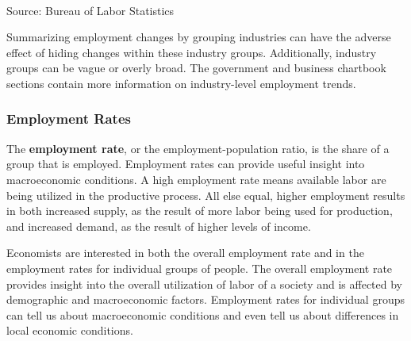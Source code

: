 \documentclass{report}
\newcommand{\tbllink}[1]{\href{https://raw.githubusercontent.com/bdecon/US-chartbook/master/chartbook/data/#1}{\faTable}}
\begin{document}
{\begin{minipage}{0.83\textwidth}
\hspace*{-3mm} \noindent {} \setlength{\tabcolsep}{3.6pt} \color{black!90}
		{\renewcommand{\arraystretch}{1.55}
		 \begin{tabular}{p{45mm} R{12.8mm} R{10.8mm} R{10.6mm} R{10.6mm} 
		   | R{12.0mm} R{10.6mm}}
			  \hline
		\end{tabular}
		}	\\
		
\vspace{-2mm}
\footnotesize{Source: Bureau of Labor Statistics} \hfill \tbllink{ces_data.csv}
\end{minipage}
\vspace{3mm}

\begin{minipage}{0.76\textwidth}
\small Summarizing employment changes by grouping industries can have the adverse effect of hiding changes within these industry groups. Additionally, industry groups can be vague or overly broad. The government and business chartbook sections contain more information on industry-level employment trends. 
\end{minipage}
\newpage
\vspace*{-10mm}

\begin{minipage}{0.76\textwidth} 
\subsubsection*{Employment Rates} 
\vspace{-0.5mm}
\small The \textbf{employment rate}, or the employment-population ratio, is the share of a group that is employed. Employment rates can provide useful insight into macroeconomic conditions. A high employment rate means available labor are being utilized in the productive process. All else equal, higher employment results in both increased supply, as the result of more labor being used for production, and increased demand, as the result of higher levels of income.

Economists are interested in both the overall employment rate and in the employment rates for individual groups of people. The overall employment rate provides insight into the overall utilization of labor of a society and is affected by demographic and macroeconomic factors. Employment rates for individual groups can tell us about macroeconomic conditions and even tell us about differences in local economic conditions. 


\end{minipage}}
\end{document}
